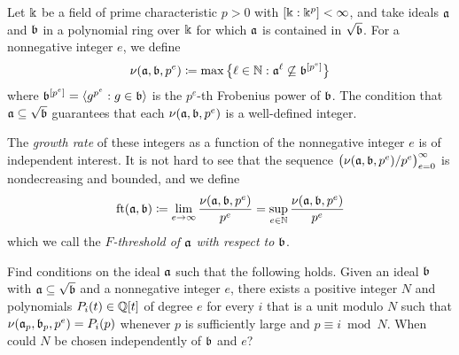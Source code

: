 \documentclass{amsart}
\begin{document}
Let $\Bbbk$ be a field of prime characteristic $p>0$ with $[\Bbbk:\Bbbk^p] < \infty$, and take ideals $\mathfrak{a}$ and $\mathfrak{b}$ in a polynomial ring over $\Bbbk$ for which $\mathfrak{a}$ is contained in $\sqrt {\mathfrak{b}}$.
For a nonnegative integer $e$, we define
%
\[\nu(\mathfrak{a},\mathfrak{b},p^e) \coloneqq \max\big\{\ell\in \mathbb{N} : \mathfrak{a}^{\ell} \not\subseteq \mathfrak{b}^{[p^e]}\big\}\]
%
where $\mathfrak{b}^{[p^e]} = \langle g^{p^e} : g \in \mathfrak{b} \rangle$ is the $p^e$-th Frobenius power of $\mathfrak{b}$.
The condition that $\mathfrak{a} \subseteq \sqrt {\mathfrak{b}}$ guarantees that each $\nu(\mathfrak{a}, \mathfrak{b}, p^e)$ is a well-defined integer.

The \emph{growth rate} of these integers as a function of the nonnegative integer $e$ is of independent interest.
It is not hard to see that the sequence $\big(\nu(\mathfrak{a},\mathfrak{b},p^e)/p^e\big)_{e=0}^{\infty}$ is nondecreasing and bounded,  and we define
\[
   \operatorname{ft}(\mathfrak{a}, \mathfrak{b}) \coloneqq \lim_{e \to \infty} \frac{\nu(\mathfrak{a}, \mathfrak{b}, p^e)}{p^e}  = \sup_{e\in \mathbb{N}} \frac{\nu(\mathfrak{a},\mathfrak{b},p^e)}{p^e}
\]
which we call the \emph{$F$-threshold of $\mathfrak{a}$ with respect to $\mathfrak{b}$}.



\begin{problem}
   Find conditions on the ideal $\mathfrak{a}$ such that the following holds.
   Given an ideal $\mathfrak{b}$ with $\mathfrak{a} \subseteq \sqrt {\mathfrak{b}}$ and a nonnegative integer $e$, there exists a positive integer $N$ and polynomials $P_i(t) \in \mathbb{Q}[t]$ of degree $e$ for every $i$ that is a unit modulo $N$ such that $\nu(\mathfrak{a}_p, \mathfrak{b}_p, p^e) = P_i(p)$ whenever $p$ is sufficiently large and $p \equiv i \bmod N$.
   When could $N$ be chosen independently of $\mathfrak{b}$ and $e$?
\end{problem}

\end{document}
